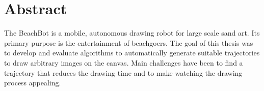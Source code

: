 \chapter*{Abstract}

The BeachBot is a mobile, autonomous drawing robot for large scale sand art. Its primary purpose is the entertainment of beachgoers. The goal of this thesis was to develop and evaluate algorithms to automatically generate suitable trajectories to draw arbitrary images on the canvas. Main challenges have been to find a trajectory that reduces the drawing time and to make watching the drawing process appealing.
